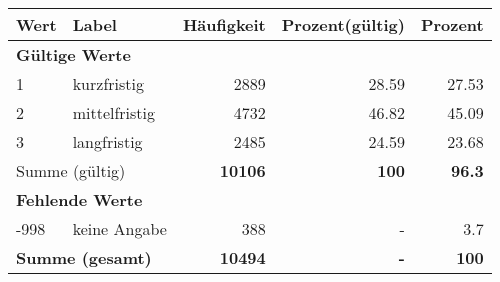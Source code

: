      \begin{longtable}{lXrrr}
     \toprule
     \textbf{Wert} & \textbf{Label} & \textbf{Häufigkeit} & \textbf{Prozent(gültig)} & \textbf{Prozent} \\
     \endhead
     \midrule
     \multicolumn{5}{l}{\textbf{Gültige Werte}}\\

     1 &
     \multicolumn{1}{X}{ kurzfristig   } &


       \num{2889} &
       \num[round-mode=places,round-precision=2]{28.59} &
         \num[round-mode=places,round-precision=2]{27.53} \\

     2 &
     \multicolumn{1}{X}{ mittelfristig   } &


       \num{4732} &
       \num[round-mode=places,round-precision=2]{46.82} &
         \num[round-mode=places,round-precision=2]{45.09} \\

     3 &
     \multicolumn{1}{X}{ langfristig   } &


       \num{2485} &
       \num[round-mode=places,round-precision=2]{24.59} &
         \num[round-mode=places,round-precision=2]{23.68} \\
     \midrule
     \multicolumn{2}{l}{Summe (gültig)} &
       \textbf{\num{10106}} &
     \textbf{\num{100}} &
       \textbf{\num[round-mode=places,round-precision=2]{96.3}} \\
     \multicolumn{5}{l}{\textbf{Fehlende Werte}}\\
       -998 &
       keine Angabe &
         \num{388} &
        - &
         \num[round-mode=places,round-precision=2]{3.7} \\
     \midrule
     \multicolumn{2}{l}{\textbf{Summe (gesamt)}} &
          \textbf{\num{10494}} &
        \textbf{-} &
        \textbf{\num{100}} \\
     \bottomrule
     \end{longtable}
     
